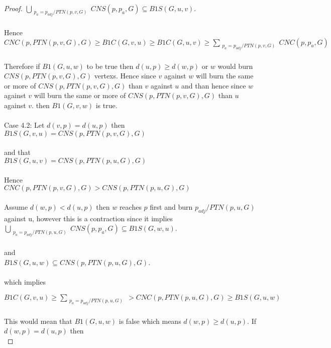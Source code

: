 \documentclass{article}
\begin{document}
\begin{proof}
\(\bigcup_{\substack{p_a = p_{adj}/PTN(p, v, G)}} CNS(p,p_a,G) \subseteq  B1S(G,u,v)\).
\\\\
Hence
\\

\(CNC(p,PTN(p,v,G),G) \ge B1C(G,v,u) \ge B1C(G,u,v) \ge \sum_{\substack{p_a=p_{adj}/PTN(p,v,G)}} CNC(p,p_a,G) \)
\\\\
Therefore if \(B1(G,u,w)\) to be true then \(d(u,p) \ge d(w,p)\) or \(w\) would burn \(CNS(p,PTN(p,v,G),G)\) vertexs.
Hence since \(v\) against \(w\) will burn the same or more of \(CNS(p,PTN(p,v,G),G) \) than  \(v\) against \(u\)
and than hence since \(w\) against \(v\) will burn the same or more of \(CNS(p,PTN(p,v,G),G) \) than \(u\) against \(v\).
then \(B1(G,v,w)\) is true.
\\\\
Case 4.2: Let \(d(v,p) = d(u,p)\) then 
\\

\(B1S(G,v,u) = CNS(p,PTN(p,v,G),G)\) 
\\\\
and that
\\

\(B1S(G,u,v) = CNS(p,PTN(p,u,G),G)\) 
\\\\
Hence
\\

\(CNC(p,PTN(p,v,G),G) > CNS(p,PTN(p,u,G),G) \)
\\\\

Assume \(d(w,p) < d(u,p)\) then \(w\) reaches \(p\) first and burn \(p_{adj}/PTN(p, u, G)\) against u,
however this is a contraction since it implies
\\

\(\bigcup_{\substack{p_a = p_{adj}/PTN(p, u, G)}} CNS(p,p_a,G) \subseteq  B1S(G,w,u)\).
\\\\
and 
\\

\(B1S(G,u,w) \subseteq  CNS(p,PTN(p,u,G),G)\).
\\\\
which implies

\(B1C(G,v,u) \ge \sum_{\substack{p_a=p_{adj}/PTN(p,u,G)}} > CNC(p,PTN(p,u,G),G) \ge B1S(G,u,w) \)
\\\\
This would mean that \(B1(G,u,w)\) is false which means \(d(w,p) \ge d(u,p)\). 
If \(d(w,p) = d(u,p)\) then 
\\


\end{proof}
\end{document}
